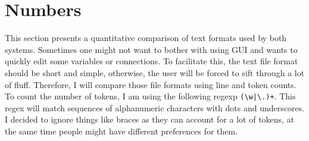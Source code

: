 \documentclass[12pt]{report}
\begin{document}
\section{Numbers} 
This section presents a quantitative comparison of text formats used by both systems. Sometimes one might not want to bother with using GUI and wants to quickly edit some variables or connections. To facilitate this, the text file format should be short and simple, otherwise, the user will be forced to sift through a lot of fluff. Therefore, I will compare those file formats using line and token counts. 
To count the number of tokens, I am using the following regexp \verb!(\w|\.)+!. This regex will match sequences of alphanumeric characters with dots and underscores. I decided to ignore things like braces as they can account for a lot of tokens, at the same time people might have different preferences for them. 
\end{document}
